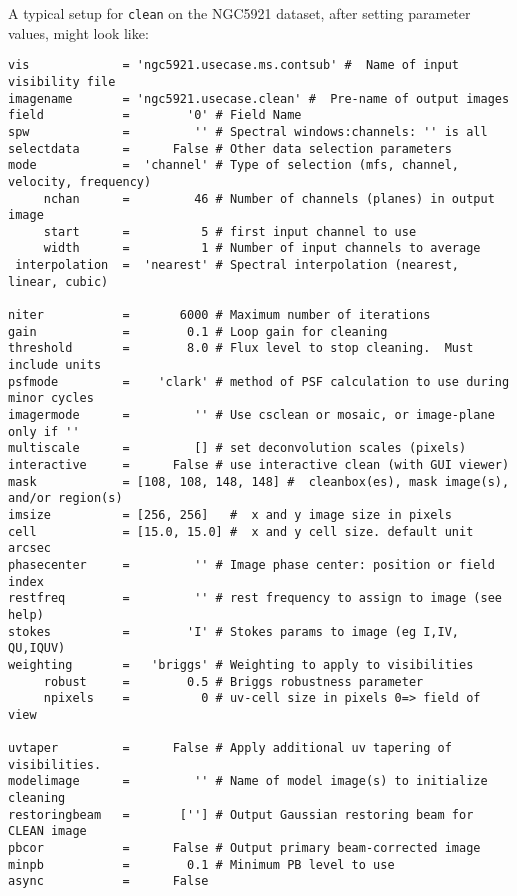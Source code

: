 A typical setup for {\tt clean} on the NGC5921 dataset, 
after setting parameter values, might look like:
\small
\begin{verbatim}
vis             = 'ngc5921.usecase.ms.contsub' #  Name of input visibility file
imagename       = 'ngc5921.usecase.clean' #  Pre-name of output images
field           =        '0' # Field Name
spw             =         '' # Spectral windows:channels: '' is all
selectdata      =      False # Other data selection parameters
mode            =  'channel' # Type of selection (mfs, channel, velocity, frequency)
     nchan      =         46 # Number of channels (planes) in output image
     start      =          5 # first input channel to use
     width      =          1 # Number of input channels to average
 interpolation  =  'nearest' # Spectral interpolation (nearest, linear, cubic)

niter           =       6000 # Maximum number of iterations
gain            =        0.1 # Loop gain for cleaning
threshold       =        8.0 # Flux level to stop cleaning.  Must include units
psfmode         =    'clark' # method of PSF calculation to use during minor cycles
imagermode      =         '' # Use csclean or mosaic, or image-plane only if ''
multiscale      =         [] # set deconvolution scales (pixels)
interactive     =      False # use interactive clean (with GUI viewer)
mask            = [108, 108, 148, 148] #  cleanbox(es), mask image(s), and/or region(s)
imsize          = [256, 256]   #  x and y image size in pixels
cell            = [15.0, 15.0] #  x and y cell size. default unit arcsec
phasecenter     =         '' # Image phase center: position or field index
restfreq        =         '' # rest frequency to assign to image (see help)
stokes          =        'I' # Stokes params to image (eg I,IV, QU,IQUV)
weighting       =   'briggs' # Weighting to apply to visibilities
     robust     =        0.5 # Briggs robustness parameter
     npixels    =          0 # uv-cell size in pixels 0=> field of view

uvtaper         =      False # Apply additional uv tapering of  visibilities.
modelimage      =         '' # Name of model image(s) to initialize cleaning
restoringbeam   =       [''] # Output Gaussian restoring beam for CLEAN image
pbcor           =      False # Output primary beam-corrected image
minpb           =        0.1 # Minimum PB level to use
async           =      False        
\end{verbatim}
\normalsize


